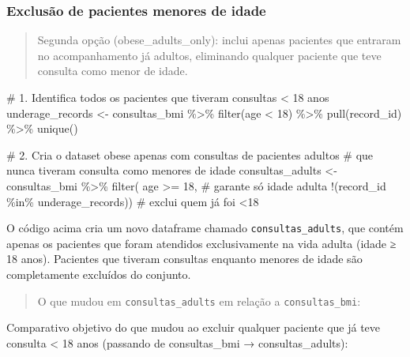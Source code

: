 \documentclass[
]{article}
\newenvironment{Shaded}{\begin{snugshade}}{\end{snugshade}}
\newcommand{\CommentTok}[1]{\textcolor[rgb]{0.37,0.37,0.37}{#1}}
\newcommand{\DecValTok}[1]{\textcolor[rgb]{0.68,0.00,0.00}{#1}}
\newcommand{\FunctionTok}[1]{\textcolor[rgb]{0.28,0.35,0.67}{#1}}
\newcommand{\NormalTok}[1]{\textcolor[rgb]{0.00,0.23,0.31}{#1}}
\newcommand{\OtherTok}[1]{\textcolor[rgb]{0.00,0.23,0.31}{#1}}
\newcommand{\SpecialCharTok}[1]{\textcolor[rgb]{0.37,0.37,0.37}{#1}}
\begin{document}
\subsubsection{Exclusão de pacientes menores de
idade}\label{exclusuxe3o-de-pacientes-menores-de-idade}

\begin{quote}
Segunda opção (obese\_adults\_only): inclui apenas pacientes que
entraram no acompanhamento já adultos, eliminando qualquer paciente que
teve consulta como menor de idade.
\end{quote}

\begin{Shaded}
\begin{Highlighting}[]
\CommentTok{\# 1. Identifica todos os pacientes que tiveram consultas \textless{} 18 anos}
\NormalTok{underage\_records }\OtherTok{\textless{}{-}}\NormalTok{ consultas\_bmi }\SpecialCharTok{\%\textgreater{}\%} 
  \FunctionTok{filter}\NormalTok{(age }\SpecialCharTok{\textless{}} \DecValTok{18}\NormalTok{) }\SpecialCharTok{\%\textgreater{}\%} 
  \FunctionTok{pull}\NormalTok{(record\_id) }\SpecialCharTok{\%\textgreater{}\%} 
  \FunctionTok{unique}\NormalTok{()}

\CommentTok{\# 2. Cria o dataset \textquotesingle{}obese\textquotesingle{} apenas com consultas de pacientes adultos}
\CommentTok{\#    que nunca tiveram consulta como menores de idade}
\NormalTok{consultas\_adults }\OtherTok{\textless{}{-}}\NormalTok{ consultas\_bmi }\SpecialCharTok{\%\textgreater{}\%} 
  \FunctionTok{filter}\NormalTok{(}
\NormalTok{    age }\SpecialCharTok{\textgreater{}=} \DecValTok{18}\NormalTok{,                           }\CommentTok{\# garante só idade adulta}
    \SpecialCharTok{!}\NormalTok{(record\_id }\SpecialCharTok{\%in\%}\NormalTok{ underage\_records))  }\CommentTok{\# exclui quem já foi \textless{}18}
\end{Highlighting}
\end{Shaded}

O código acima cria um novo dataframe chamado
\texttt{consultas\_adults}, que contém apenas os pacientes que foram
atendidos exclusivamente na vida adulta (idade ≥ 18 anos). Pacientes que
tiveram consultas enquanto menores de idade são completamente excluídos
do conjunto.

\begin{quote}
O que mudou em \texttt{consultas\_adults} em relação a
\texttt{consultas\_bmi}:
\end{quote}

Comparativo objetivo do que mudou ao excluir qualquer paciente que já
teve consulta \textless{} 18 anos (passando de consultas\_bmi →
consultas\_adults):
\end{document}
